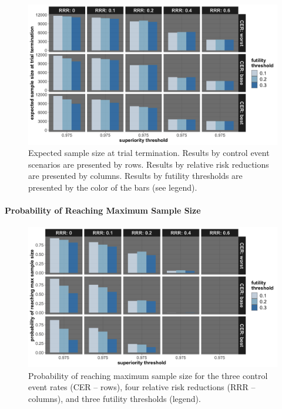 \documentclass[]{article}
\let\oldparagraph\paragraph
\renewcommand{\paragraph}[1]{\oldparagraph{#1}\mbox{}}
\begin{document}
\begin{figure}
  \caption{Expected sample size at trial termination. Results by control event scenarios are presented by rows. Results
  by relative risk reductions are presented by columns. Results by futility thresholds are presented by the color of the bars (see legend).}
  \includegraphics{../p1_plots/batch_size_nb_3000/exp_sample_size_p1.png}
\end{figure}

\hypertarget{probability-of-reaching-maximum-sample-size-2}{%
\paragraph{Probability of Reaching Maximum Sample
Size}\label{probability-of-reaching-maximum-sample-size-2}}

\begin{figure}
  \caption{Probability of reaching maximum sample size for the three control event rates (CER – rows), four relative
  risk reductions (RRR – columns), and three futility thresholds (legend).}
  \includegraphics{../p1_plots/batch_size_nb_3000/prob_reach_max_size_p1.png}
\end{figure}
\end{document}

